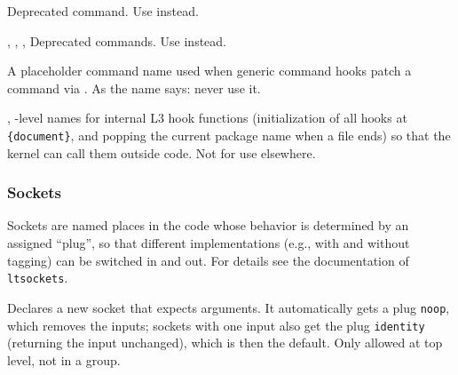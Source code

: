\documentclass{l3in2edoc}
\begin{document}
\begin{function}[int]
  {
    \DisableHook
  }
  Deprecated command. Use
   instead.
\end{function}



\begin{function}[int]
  {
    \ProvideHook,
    \ProvideReversedHook,
    \ProvideMirroredHookPair,
  }
  Deprecated commands. Use
   instead.
\end{function}




\begin{function}[int]
  {
  }
  A placeholder command name used when generic command hooks patch a
  command via . As the name says: never use it.
\end{function}



\begin{function}[int]
  {
    \@expl@@@initialize@all@@,
    \@expl@@@hook@curr@name@pop@@
  }
  \LaTeXe{}-level names for internal L3 hook functions
  (initialization of all hooks at \texttt{\{document\}},
  and popping the current package name when a file ends) so that the
  kernel can call them outside  code. Not for use elsewhere.
\end{function}



\subsubsection{Sockets}

Sockets are named places in the code whose behavior is determined by
an assigned \enquote{plug}, so that different implementations (e.g.,
with and without tagging) can be switched in and out. For details see
the documentation of \texttt{ltsockets}.

\begin{function}[]
  {
    \NewSocket
  }
  \begin{syntax}
      
  \end{syntax}
  Declares a new socket that expects 
  arguments. It automatically gets a plug \texttt{noop}, which
  removes the inputs; sockets with one input also get the plug
  \texttt{identity} (returning the input unchanged), which is then
  the default. Only allowed at top level, not in a group.
\end{function}
\end{document}
